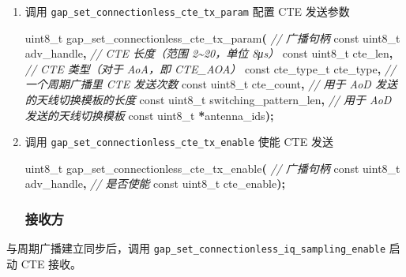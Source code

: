 \documentclass[
  12pt,
]{book}
\newenvironment{Shaded}{\begin{snugshade}}{\end{snugshade}}
\newcommand{\CommentTok}[1]{\textcolor[rgb]{0.56,0.35,0.01}{\textit{#1}}}
\newcommand{\DataTypeTok}[1]{\textcolor[rgb]{0.13,0.29,0.53}{#1}}
\newcommand{\NormalTok}[1]{#1}
\newcommand{\OperatorTok}[1]{\textcolor[rgb]{0.81,0.36,0.00}{\textbf{#1}}}
\begin{document}
\begin{enumerate}
\def\labelenumi{\arabic{enumi}.}
\item
  调用 \texttt{gap\_set\_connectionless\_cte\_tx\_param} 配置 CTE 发送参数

\begin{Shaded}
\begin{Highlighting}[]
\DataTypeTok{uint8\_t}\NormalTok{ gap\_set\_connectionless\_cte\_tx\_param}\OperatorTok{(}
  \CommentTok{// 广播句柄}
  \DataTypeTok{const} \DataTypeTok{uint8\_t}\NormalTok{       adv\_handle}\OperatorTok{,}
  \CommentTok{// CTE 长度（范围 2\textasciitilde{}20，单位 8μs）}
  \DataTypeTok{const} \DataTypeTok{uint8\_t}\NormalTok{       cte\_len}\OperatorTok{,}
  \CommentTok{// CTE 类型（对于 AoA，即 CTE\_AOA）}
  \DataTypeTok{const}\NormalTok{ cte\_type\_t    cte\_type}\OperatorTok{,}
  \CommentTok{// 一个周期广播里 CTE 发送次数}
  \DataTypeTok{const} \DataTypeTok{uint8\_t}\NormalTok{       cte\_count}\OperatorTok{,}
  \CommentTok{// 用于 AoD 发送的天线切换模板的长度}
  \DataTypeTok{const} \DataTypeTok{uint8\_t}\NormalTok{       switching\_pattern\_len}\OperatorTok{,}
  \CommentTok{// 用于 AoD 发送的天线切换模板}
  \DataTypeTok{const} \DataTypeTok{uint8\_t}      \OperatorTok{*}\NormalTok{antenna\_ids}\OperatorTok{);}
\end{Highlighting}
\end{Shaded}
\item
  调用 \texttt{gap\_set\_connectionless\_cte\_tx\_enable} 使能 CTE 发送

\begin{Shaded}
\begin{Highlighting}[]
\DataTypeTok{uint8\_t}\NormalTok{ gap\_set\_connectionless\_cte\_tx\_enable}\OperatorTok{(}
  \CommentTok{// 广播句柄}
  \DataTypeTok{const} \DataTypeTok{uint8\_t}\NormalTok{       adv\_handle}\OperatorTok{,}
  \CommentTok{// 是否使能}
  \DataTypeTok{const} \DataTypeTok{uint8\_t}\NormalTok{       cte\_enable}\OperatorTok{);}
\end{Highlighting}
\end{Shaded}

  \hypertarget{ux63a5ux6536ux65b9-1}{%
  \subsubsection{接收方}\label{ux63a5ux6536ux65b9-1}}
\end{enumerate}

与周期广播建立同步后，调用 \texttt{gap\_set\_connectionless\_iq\_sampling\_enable} 启动 CTE 接收。
\end{document}
